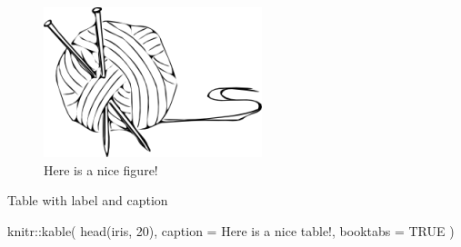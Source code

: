 \documentclass[
]{book}
\newenvironment{Shaded}{\begin{snugshade}}{\end{snugshade}}
\newcommand{\AttributeTok}[1]{\textcolor[rgb]{0.77,0.63,0.00}{#1}}
\newcommand{\ConstantTok}[1]{\textcolor[rgb]{0.00,0.00,0.00}{#1}}
\newcommand{\DecValTok}[1]{\textcolor[rgb]{0.00,0.00,0.81}{#1}}
\newcommand{\FunctionTok}[1]{\textcolor[rgb]{0.00,0.00,0.00}{#1}}
\newcommand{\NormalTok}[1]{#1}
\newcommand{\SpecialCharTok}[1]{\textcolor[rgb]{0.00,0.00,0.00}{#1}}
\newcommand{\StringTok}[1]{\textcolor[rgb]{0.31,0.60,0.02}{#1}}
\begin{document}
\begin{figure}

{\centering \includegraphics[width=0.8\linewidth]{knit-logo} 

}

\caption{Here is a nice figure!}\label{fig:nice-fig2}
\end{figure}

Table with label and caption

\begin{Shaded}
\begin{Highlighting}[]
\NormalTok{knitr}\SpecialCharTok{::}\FunctionTok{kable}\NormalTok{(}
  \FunctionTok{head}\NormalTok{(iris, }\DecValTok{20}\NormalTok{), }\AttributeTok{caption =} \StringTok{\textquotesingle{}Here is a nice table!\textquotesingle{}}\NormalTok{,}
  \AttributeTok{booktabs =} \ConstantTok{TRUE}
\NormalTok{)}
\end{Highlighting}
\end{Shaded}
\end{document}
